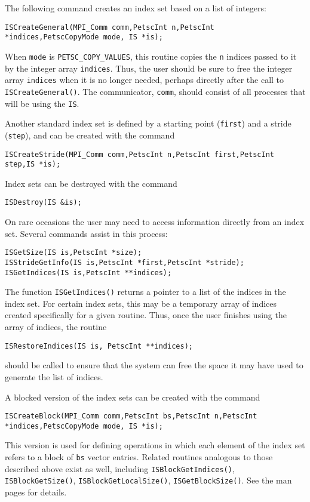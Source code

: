 The following command creates an index set based on a list
of integers:
\begin{lstlisting}
ISCreateGeneral(MPI_Comm comm,PetscInt n,PetscInt *indices,PetscCopyMode mode, IS *is);
\end{lstlisting}
When \lstinline{mode} is \lstinline{PETSC_COPY_VALUES}, this routine copies the \lstinline{n} indices passed
to it by the integer array \lstinline{indices}.
Thus, the user should be sure to free the integer array \lstinline{indices}
when it is no longer needed, perhaps directly after the call to
\lstinline{ISCreateGeneral()}. The communicator, \lstinline{comm}, should consist of all
processes that will be using the \lstinline{IS}.

Another standard index set is defined by a starting point (\lstinline{first}) and a
stride (\lstinline{step}),  and can be created with the command
\begin{lstlisting}
ISCreateStride(MPI_Comm comm,PetscInt n,PetscInt first,PetscInt step,IS *is);
\end{lstlisting}

Index sets can be destroyed with the command
\begin{lstlisting}
ISDestroy(IS &is);
\end{lstlisting}

On rare occasions the user may need to access information directly from an index set.
Several commands assist in this process:
\begin{lstlisting}
ISGetSize(IS is,PetscInt *size);
ISStrideGetInfo(IS is,PetscInt *first,PetscInt *stride);
ISGetIndices(IS is,PetscInt **indices);
\end{lstlisting}
The function \lstinline{ISGetIndices()} returns a pointer to a list of the
indices in the index set.
For certain index sets, this may be a
temporary array of indices created specifically for a given routine.
Thus, once the user finishes using the array of indices,
the routine
\begin{lstlisting}
ISRestoreIndices(IS is, PetscInt **indices);
\end{lstlisting}
should be called to ensure that the system can free the space it
may have used to generate the list of indices.

A blocked version of the index sets can be created with the command
\begin{lstlisting}
ISCreateBlock(MPI_Comm comm,PetscInt bs,PetscInt n,PetscInt *indices,PetscCopyMode mode, IS *is);
\end{lstlisting}
This version is used for defining operations in which each element of the index
set refers to a block of \lstinline{bs} vector entries.  Related routines analogous
to those described above exist as well, including
\lstinline{ISBlockGetIndices()}, \lstinline{ISBlockGetSize()}, \lstinline{ISBlockGetLocalSize()}, \lstinline{ISGetBlockSize()}.
See the man pages for details.

